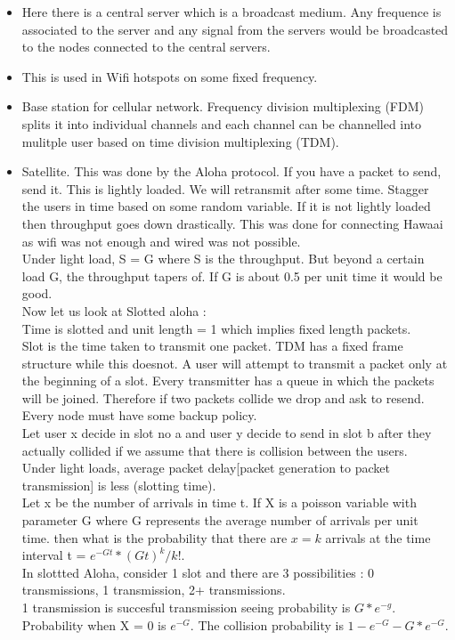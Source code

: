 \documentclass[solution,addpoints,12pt]{exam}
\begin{document}
\begin{itemize}
\item Here there is a central server which is
a broadcast medium. Any frequence is associated to the server
and any signal from the servers would be broadcasted to
the nodes connected to the central servers.
\item This is used in Wifi hotspots on some fixed frequency.
\item Base station for cellular network.
Frequency division multiplexing (FDM)
splits it into individual channels and each channel
can be channelled into mulitple user based on time division
multiplexing (TDM).
\item Satellite. This was done by the Aloha protocol.
If you have a packet to send, send it. This is lightly loaded.
We will retransmit after some time. Stagger the users in time
based on some random variable. If it is not lightly loaded
then throughput goes down drastically.
This was done for connecting Hawaai as wifi was not enough and
wired was not possible.\\

Under light load, S = G where S is the throughput. But beyond a
certain load G, the throughput tapers of. If G is about 0.5 per unit time
it would be good.\\

Now let us look at Slotted aloha :\\
Time is slotted and unit length = 1 which implies fixed length packets.\\
Slot is the time taken to transmit one packet. TDM has a fixed frame structure
while this doesnot. A user will attempt to transmit a packet only at the
beginning of a slot. Every transmitter has a queue in which the packets
will be joined. Therefore if two packets collide we drop and ask to resend.
Every node must have some backup policy.\\
Let user x decide in slot no a and user y decide to send in slot b
after they actually collided if we assume that there is collision
between the users.\\

Under light loads, average packet delay[packet
generation to packet transmission] is less (slotting time).\\

Let x be the number of arrivals in time t. If X is a poisson variable
with parameter G where G represents the average number of arrivals per unit
time. then what is the probability that there are $x = k$ arrivals at the
time interval t = $e^{-Gt}*(Gt)^k/k!$.\\
In slottted Aloha, consider 1 slot and there are
3 possibilities : 0 transmissions, 1 transmission, 2+ transmissions.\\
1 transmission is succesful transmission seeing probability is $G*e^{-g}$.
Probability when X = 0 is $e^{-G}$. The collision probability
is $1-e^{-G} - G*e^{-G}$.\\


\end{itemize}
\end{document}
